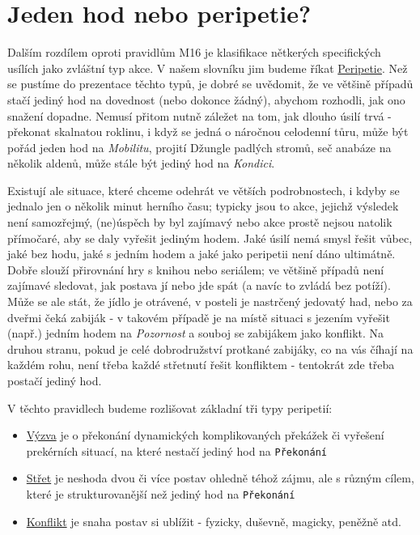 \documentclass[../main.tex]{subfiles}
\begin{document}
\section{Jeden hod nebo peripetie?}
\label{sec:hod/peripetie}

Dalším rozdílem oproti pravidlům M16 je klasifikace nětkerých specifických usílích jako zvláštní typ akce. V našem slovníku jim budeme říkat \underline{Peripetie}. Než se pustíme do prezentace těchto typů, je dobré se uvědomit, že ve většině případů stačí jediný hod na dovednost (nebo dokonce žádný), abychom rozhodli, jak ono snažení dopadne. Nemusí přitom nutně záležet na tom, jak dlouho úsilí trvá - překonat skalnatou roklinu, i když se jedná o náročnou celodenní tůru, může být pořád jeden hod na \textit{Mobilitu}, projití Džungle padlých stromů, seč anabáze na několik aldenů, může stále být jediný hod na \textit{Kondici}.

Existují ale situace, které chceme odehrát ve větších podrobnostech, i kdyby se jednalo jen o několik minut herního času; typicky jsou to akce, jejichž výsledek není samozřejmý, (ne)úspěch by byl zajímavý nebo akce prostě nejsou natolik přímočaré, aby se daly vyřešit jediným hodem. Jaké úsilí nemá smysl řešit vůbec, jaké bez hodu, jaké s jedním hodem a jaké jako peripetii není dáno ultimátně. Dobře slouží přirovnání hry s knihou nebo seriálem; ve většině případů není zajímavé sledovat, jak postava jí nebo jde spát (a navíc to zvládá bez potíží). Může se ale stát, že jídlo je otrávené, v posteli je nastrčený jedovatý had, nebo za dveřmi čeká zabiják - v takovém případě je na místě situaci s jezením vyřešit (např.) jedním hodem na \textit{Pozornost} a souboj se zabijákem jako konflikt. Na druhou stranu, pokud je celé dobrodružství protkané zabijáky, co na vás číhají na každém rohu, není třeba každé střetnutí řešit konfliktem - tentokrát zde třeba postačí jediný hod.

V těchto pravidlech budeme rozlišovat základní tři typy peripetií:

\begin{itemize}
\item \underline{Výzva} je o překonání dynamických komplikovaných překážek či vyřešení prekérních situací, na které nestačí jediný hod na \texttt{Překonání}
\item \underline{Střet} je neshoda dvou či více postav ohledně téhož zájmu, ale s různým cílem, které je strukturovanější než jediný hod na \texttt{Překonání}
\item \underline{Konflikt} je snaha postav si ublížit - fyzicky, duševně, magicky, peněžně atd.
\end{itemize}
\end{document}
